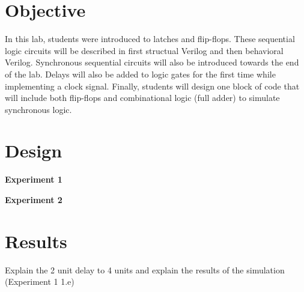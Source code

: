 \documentclass[a4paper,12pt]{article}
\date{\today}
\begin{document}
\section*{Objective}

  \hspace{15pt}In this lab, students were introduced to latches and flip-flops. These sequential logic
  circuits will be described in first structual Verilog and then behavioral Verilog.
  Synchronous sequential circuits will also be introduced towards the end of the lab.
  Delays will also be added to logic gates for the first time while implementing a
  clock signal. Finally, students will design one block of code that will include
  both flip-flops and combinational logic (full adder) to simulate synchronous logic.

\section*{Design}
  \textbf{Experiment 1}

  

  

  

  

  

  \textbf{Experiment 2}

  

  

  

  

\section*{Results}

  Explain the 2 unit delay to 4 units and explain the results of the simulation
  (Experiment 1 1.e) \\
\end{document}
